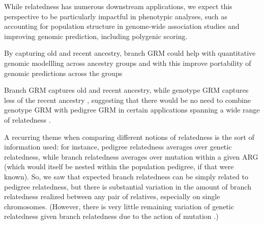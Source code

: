 


While relatedness has numerous downstream applications, we expect this perspective to be particularly impactful in phenotypic analyses, such as accounting for population structure in genome-wide association studies and improving genomic prediction, including polygenic scoring.

By capturing old and recent ancestry,
branch GRM could help with quantitative genomic modellling across ancestry groups
and with this improve portability of genomic predictions across the groups
\citep{legarra2021correlation, durvasula2021negative, wang2022challenges, prive2022portability, schultz2022stability, yair2022population}

Branch GRM captures old and recent ancestry, while genotype GRM captures less of the recent ancestry
\citep[e.g.]{fan2022genealogical, young2022discovering}, suggesting that there would be no need to combine genotype GRM with pedigree GRM in certain applications spanning a wide range of relatedness \citep[e.g.]{vanraden2008efficient, kemper2021phenotypic}.



A recurring theme when comparing different notions of relatedness
is the sort of information used:
for instance, pedigree relatedness averages over genetic relatedness,
while branch relatedness averages over mutation within a given ARG
(which would itself be nested within the population pedigree, if that were known).
So, we saw that expected branch relatedness can be simply related
to pedigree relatedness, but there is substantial variation
in the amount of branch relatedness realized between any pair of relatives,
especially on single chromosomes.
(However, there is very little remaining variation of genetic relatedness
given branch relatedness due to the action of mutation \citep{ralph2019empirical}.)